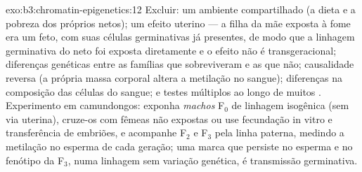 \begin{solution}{exo:b3:chromatin-epigenetics:12}
Excluir: um ambiente compartilhado (a dieta e a pobreza dos próprios
netos); um efeito uterino --- a filha da mãe exposta à fome era um
feto, com suas células germinativas já presentes, de modo que a
linhagem germinativa do neto foi exposta diretamente e o efeito não é
transgeracional; diferenças genéticas entre as famílias que
sobreviveram e as que não; causalidade reversa (a própria massa
corporal altera a metilação no sangue); diferenças na composição das
células do sangue; e testes múltiplos ao longo de muitos .
Experimento em camundongos: exponha \emph{machos} F$_0$ de linhagem
isogênica (sem via uterina), cruze-os com fêmeas não expostas ou use
fecundação in vitro e transferência de embriões, e acompanhe F$_2$ e
F$_3$ pela linha paterna, medindo a metilação no esperma de cada
geração; uma marca que persiste no esperma e no fenótipo da F$_3$, numa
linhagem sem variação genética, é transmissão germinativa.
\end{solution}

